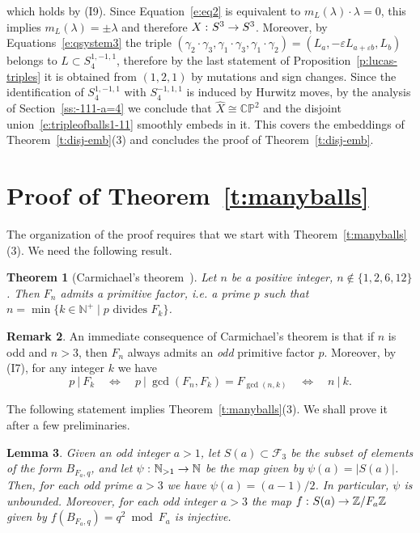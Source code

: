 \documentclass[11pt,a4paper]{amsart}
\newcommand{\N}{\mathbb N}
\newcommand{\CP}{\mathbb{CP}}
\newcommand{\Z}{\mathbb Z}
\newcommand{\F}{\mathcal F}
\newcommand{\ep}{\varepsilon}
\newcommand{\ga}{\gamma}
\newcommand{\la}{\lambda}
\newcommand{\co}{\thinspace\colon}
\newtheorem{thm}{Theorem}[section]
\newtheorem{lemma}[thm]{Lemma}
\theoremstyle{definition}
\newtheorem{rmk}[thm]{Remark}
\numberwithin{equation}{section}
\begin{document}
which holds by (I9). 
Since Equation~\eqref{e:eq2} is equivalent to $m_L(\la)\cdot\la=0$, 
this implies $m_L(\la) = \pm \la$ and therefore $X\co S^3\to S^3$. 
Moreover, by Equations~\eqref{e:qsystem3} the triple 
$(\ga_2\cdot\ga_3, \ga_1\cdot\ga_3,\ga_1\cdot\ga_2) = (L_a,-\ep L_{a+\ep b},L_b)$ 
belongs to $L\subset S^{1,-1,1}_4$, therefore by the last statement of Proposition~\ref{p:lucas-triples}
it is obtained from $(1,2,1)$ by mutations and sign changes. Since the identification 
of $S^{1,-1,1}_4$ with $S^{-1,1,1}_4$ is induced by Hurwitz moves, by the analysis of 
Section~\ref{ss:-111-a=4} we conclude that $\hat X\cong\CP^2$ and the 
disjoint union~\eqref{e:tripleofballs1-11} smoothly embeds in it. 
This covers the embeddings of Theorem~\ref{t:disj-emb}(3) and concludes the proof 
of Theorem~\ref{t:disj-emb}.

\section{Proof of Theorem~\ref{t:manyballs}}\label{s:manyballs} 

The organization of the proof requires that we start with Theorem~\ref{t:manyballs}(3). 
We need the following result. 

\begin{thm}[Carmichael's theorem~\cite{Ca13}]\label{t:carmichael}
Let $n$ be a positive integer, $n \notin \{1,2,6,12\}$. Then $F_n$ admits a primitive factor, 
i.e. a prime $p$ such that $n=\min \{k \in \N^+ \; | \; p \text{ divides } F_k \}$. 
\end{thm}

\begin{rmk}\label{r:carm-cor}
An immediate consequence of Carmichael's theorem is that if $n$ is odd and $n>3$, then $F_n$ 
always admits an {\em odd} primitive factor $p$. Moreover, by (I7), for any integer $k$ we have 
\[
p\ |\ F_k\quad \Longleftrightarrow\quad p\ |\ \gcd(F_n,F_k) = F_{\gcd(n,k)} 
\quad\Longleftrightarrow\quad n\ |\ k.
\]
\end{rmk}

The following statement implies Theorem~\ref{t:manyballs}(3). 
We shall prove it after a few preliminaries. 

\begin{lemma}\label{l:precise}
Given an odd integer $a>1$, let $S(a)\subset\F_3$ be the subset of elements of the form $B_{F_a,q}$, and let $\psi\co\N_{>1}\to\N$ be the map given by $\psi(a) = \left|S(a)\right|$. 
Then, for each odd prime $a>3$ we have $\psi(a)= (a-1)/2$. In particular, $\psi$ is unbounded. Moreover, for each odd 
integer $a>3$ the map $f\co S(a)\to\Z/F_a\Z$ 
given by $f(B_{F_a,q}) = q^2\bmod F_a$ is injective. %
\end{lemma}
\end{document}
